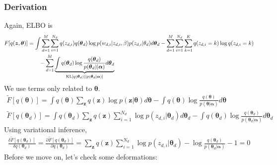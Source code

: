 \documentclass[a4paper,10.5pt,dvipdfmx]{jarticle}  %
\begin{document}
\subsubsection{Derivation}
Again, ELBO is
\begin{align}
	F[q(\boldsymbol{z}, \boldsymbol{\theta})]  &= \int \sum_{d=1}^{M} \sum_{i=1}^{N_d} q(z_{d,i}) q(\boldsymbol{\theta}_d) \log p(w_{d,i} | z_{d,i}, \beta) p(z_{d,i} | \theta_{d}) d \boldsymbol{\theta}_d - \sum_{d=1}^{M} \sum_{i=1}^{N_d} \sum_{k=1}^{K} q(z_{d,i} = k) \log q(z_{d,i} = k) \\ &\qquad - \sum_{d=1}^{M} \underbrace{\int q(\boldsymbol{\theta}_d) \log \frac{q(\boldsymbol{\theta}_d)}{p(\boldsymbol{\theta}_d) | \boldsymbol{\alpha})} d \boldsymbol{\theta}_d}_{{\rm KL}\left[ q(\boldsymbol{\theta}_d) || p(\boldsymbol{\theta}_d | \boldsymbol{\alpha}) \right]} \nonumber
\end{align}
We use terms only related to $\boldsymbol{\theta}$.
\begin{align}
	\widetilde{F}[q(\boldsymbol{\theta})] = \int q(\boldsymbol{\theta}) \sum_{\boldsymbol{z}} q(\boldsymbol{z}) \log p(\boldsymbol{z} | \boldsymbol{\theta}) d \boldsymbol{\theta} - \int q(\boldsymbol{\theta}) \log \frac{q(\boldsymbol{\theta})}{p(\boldsymbol{\theta} | \boldsymbol{\alpha})} d \boldsymbol{\theta} \\
	\widetilde{F}[q(\boldsymbol{\theta}_d)] = \int q(\boldsymbol{\theta}_d) \sum_{\boldsymbol{z}} q(\boldsymbol{z}) \sum_{i=1}^{N_d} \log p(z_{d,i} | \boldsymbol{\theta}_d) d \boldsymbol{\theta}_d - \int q(\boldsymbol{\theta}_d) \log \frac{q(\boldsymbol{\theta}_d)}{p(\boldsymbol{\theta}_d | \boldsymbol{\alpha})} d \boldsymbol{\theta}_d
\end{align}
Using variational inference,
\begin{align}
	\frac{\delta \widetilde{F}[q(\boldsymbol{\theta}_d)]}{\delta q(\boldsymbol{\theta}_d)} = \frac{\partial \widetilde{F}[q(\boldsymbol{\theta}_d)]}{\partial q(\boldsymbol{\theta}_d)} = \sum_{\boldsymbol{z}} q(\boldsymbol{z}) \sum_{i=1}^{N_d} \log p(z_{d,i} | \boldsymbol{\theta}_d) - \log \frac{q(\boldsymbol{\theta}_d)}{p(\boldsymbol{\theta}_d | \boldsymbol{\alpha})} - 1 = 0
\end{align}
Before we move on, let's check some deformations:
\end{document}
